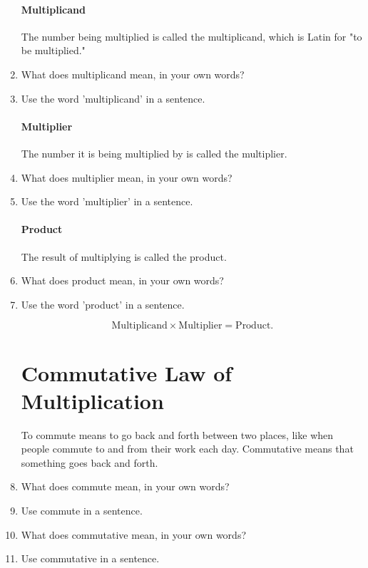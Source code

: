 \documentclass[12pt]{article}
\begin{document}
\begin{enumerate}
\paragraph{Multiplicand}
The number being multiplied is called the multiplicand, which is Latin for "to be multiplied."\\

\item What does multiplicand mean, in your own words?
\item Use the word 'multiplicand' in a sentence.

\paragraph{Multiplier}
The number it is being multiplied by is called the multiplier.\\

\item What does multiplier mean, in your own words?
\item Use the word 'multiplier' in a sentence.

\paragraph{Product}
The result of multiplying is called the product.\\

\item What does product mean, in your own words?
\item Use the word 'product' in a sentence.

$$\text{Multiplicand}\times \text{Multiplier} = \text{Product.}$$

\section*{Commutative Law of Multiplication}

To commute means to go back and forth between two places, like when people commute to and from their work each day. Commutative means that something goes back and forth.\\

\item What does commute mean, in your own words?
\item Use commute in a sentence.
\item What does commutative mean, in your own words?
\item Use commutative in a sentence.


\end{enumerate}
\end{document}
